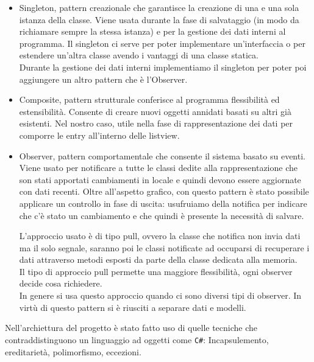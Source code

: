 \begin{itemize}
    \item Singleton, pattern creazionale che garantisce la creazione di una e una sola istanza della classe.  
    Viene usata durante la fase di salvataggio (in modo da richiamare sempre la stessa istanza) e per la gestione
    dei dati interni al programma. 
    Il singleton ci serve per poter implementare un'interfaccia o per estendere un'altra classe avendo i vantaggi di una classe statica.\\
    Durante la gestione dei dati interni implementiamo il singleton per poter poi aggiungere un altro pattern che è
    l'Observer. 
    \item Composite, pattern strutturale conferisce al programma flessibilità ed estensibilità. Consente di creare nuovi oggetti annidati basati 
    su altri già esistenti. Nel nostro caso, utile nella fase di rappresentazione dei dati per comporre le entry all'interno delle listview.

    \item Observer, pattern comportamentale che consente il sistema basato su eventi. \\
    Viene usato per notificare a tutte le classi dedite alla rappresentazione che son 
    stati apportati cambiamenti in locale e quindi devono essere aggiornate con dati recenti. 
    Oltre all'aspetto grafico, con questo pattern è stato possibile applicare un controllo in fase di uscita:
    usufruiamo della notifica per indicare che c'è stato un cambiamento e che quindi è presente la necessità di salvare.

    
    L'approccio usato è di tipo pull, ovvero la classe che notifica non invia dati ma il solo segnale, saranno
    poi le classi notificate ad occuparsi di recuperare i dati attraverso metodi esposti
    da parte della classe dedicata alla memoria. \\
    Il tipo di approccio pull permette una maggiore flessibilità, ogni observer decide cosa 
    richiedere. \\
    In genere si usa questo approccio quando ci sono diversi tipi di observer.
    In virtù di questo pattern si è riusciti a separare dati e modelli.
\end{itemize}

\vspace{0.5cm}
Nell'archiettura del progetto è stato fatto uso di quelle tecniche che contraddistinguono un linguaggio
ad oggetti come \texttt{C\#}: Incapsulemento, ereditarietà, polimorfismo, eccezioni.

